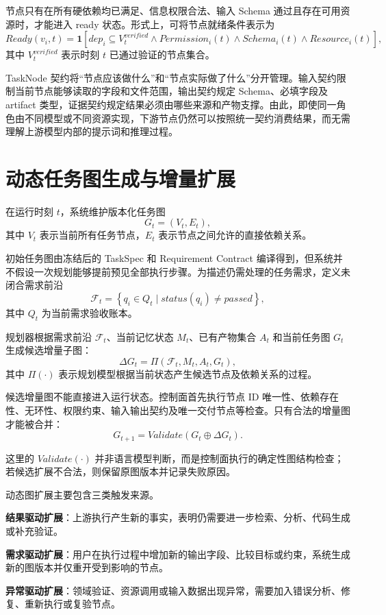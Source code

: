 \documentclass[UTF8,a4paper,12pt,oneside]{ctexbook}
\begin{document}
节点只有在所有硬依赖均已满足、信息权限合法、输入 Schema 通过且存在可用资源时，才能进入 ready 状态。形式上，可将节点就绪条件表示为
\[
Ready(v_i,t)=
\mathbf{1}
\left[
dep_i\subseteq V_t^{verified}
\land
Permission_i(t)
\land
Schema_i(t)
\land
Resource_i(t)
\right],
\]
其中 $V_t^{verified}$ 表示时刻 $t$ 已通过验证的节点集合。

TaskNode 契约将“节点应该做什么”和“节点实际做了什么”分开管理。输入契约限制当前节点能够读取的字段和文件范围，输出契约规定 Schema、必填字段及 artifact 类型，证据契约规定结果必须由哪些来源和产物支撑。由此，即使同一角色由不同模型或不同资源实现，下游节点仍然可以按照统一契约消费结果，而无需理解上游模型内部的提示词和推理过程。


\section{动态任务图生成与增量扩展}

在运行时刻 $t$，系统维护版本化任务图
\[
G_t=(V_t,E_t),
\]
其中 $V_t$ 表示当前所有任务节点，$E_t$ 表示节点之间允许的直接依赖关系。

初始任务图由冻结后的 TaskSpec 和 Requirement Contract 编译得到，但系统并不假设一次规划能够提前预见全部执行步骤。为描述仍需处理的任务需求，定义未闭合需求前沿
\[
\mathcal{F}_t=
\left\{
q_i\in Q_t
\mid
status(q_i)\neq passed
\right\},
\]
其中 $Q_t$ 为当前需求验收账本。

规划器根据需求前沿 $\mathcal{F}_t$、当前记忆状态 $M_t$、已有产物集合 $A_t$ 和当前任务图 $G_t$ 生成候选增量子图：
\[
\Delta G_t=
\Pi
\left(
\mathcal{F}_t,
M_t,
A_t,
G_t
\right),
\]
其中 $\Pi(\cdot)$ 表示规划模型根据当前状态产生候选节点及依赖关系的过程。

候选增量图不能直接进入运行状态。控制面首先执行节点 ID 唯一性、依赖存在性、无环性、权限约束、输入输出契约及唯一交付节点等检查。只有合法的增量图才能被合并：
\[
G_{t+1}
=
Validate
\left(
G_t\oplus\Delta G_t
\right).
\]

这里的 $Validate(\cdot)$ 并非语言模型判断，而是控制面执行的确定性图结构检查；若候选扩展不合法，则保留原图版本并记录失败原因。

动态图扩展主要包含三类触发来源。

\textbf{结果驱动扩展}：上游执行产生新的事实，表明仍需要进一步检索、分析、代码生成或补充验证。

\textbf{需求驱动扩展}：用户在执行过程中增加新的输出字段、比较目标或约束，系统生成新的图版本并仅重开受到影响的节点。

\textbf{异常驱动扩展}：领域验证、资源调用或输入数据出现异常，需要加入错误分析、修复、重新执行或复验节点。
\end{document}
